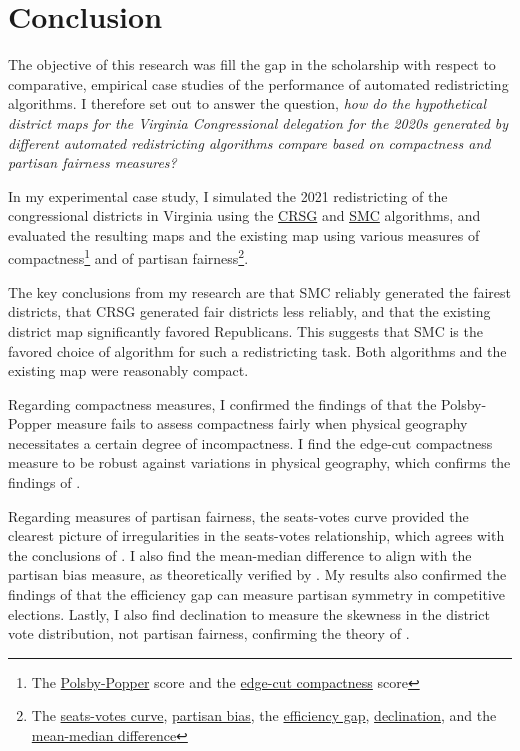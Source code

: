 \section{Conclusion}
\label{sec:conc}

The objective of this research was fill the gap in the scholarship with respect to comparative, empirical case studies of the performance of automated redistricting algorithms. I therefore set out to answer the question, \emph{how do the hypothetical district maps for the Virginia Congressional delegation for the 2020s generated by different automated redistricting algorithms compare based on compactness and partisan fairness measures?}

In my experimental case study, I simulated the 2021 redistricting of the congressional districts in Virginia using the \hyperref[sec:crsg]{CRSG} and \hyperref[sec:smc]{SMC} algorithms, and evaluated the resulting maps and the existing map using various measures of compactness\footnote{The \hyperref[sec:polsbypopper]{Polsby-Popper} score and the \hyperref[sec:edgecut]{edge-cut compactness} score} and of partisan fairness\footnote{The \hyperref[sec:seatsvotes]{seats-votes curve}, \hyperref[sec:bias]{partisan bias}, the \hyperref[sec:effgap]{efficiency gap}, \hyperref[sec:declination]{declination}, and the \hyperref[sec:meanmed]{mean-median difference}}. 

The key conclusions from my research are that SMC reliably generated the fairest districts, that CRSG generated fair districts less reliably, and that the existing district map significantly favored Republicans. This suggests that SMC is the favored choice of algorithm for such a redistricting task. Both algorithms and the existing map were reasonably compact.

Regarding compactness measures, I confirmed the findings of \textcite{mccartan2020} that the Polsby-Popper measure fails to assess compactness fairly when physical geography necessitates a certain degree of incompactness. I find the edge-cut compactness measure to be robust against variations in physical geography, which confirms the findings of \textcite{dube2016}.

Regarding measures of partisan fairness, the seats-votes curve provided the clearest picture of irregularities in the seats-votes relationship, which agrees with the conclusions of \textcite{katz2020}. I also find the mean-median difference to align with the partisan bias measure, as theoretically verified by \textcite{katz2020}. My results also confirmed the findings of \textcite{veomett2018} that the efficiency gap can measure partisan symmetry in competitive elections. Lastly, I also find declination to measure the skewness in the district vote distribution, not partisan fairness, confirming the theory of \textcite{katz2020}. 

